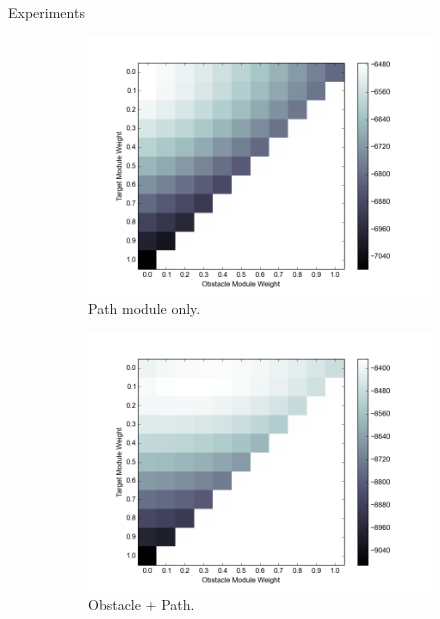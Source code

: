\documentclass[final]{beamer}
\begin{document}
\begin{frame}{}
\begin{textblock}{39}
\begin{block}{Experiments}
\begin{figure}[h]
\centering
\begin{subfigure}[b]{0.24\textwidth}
\includegraphics[width=\textwidth]{objValuesTask1.png}
\caption{Path module only.}
\end{subfigure}
\begin{subfigure}[b]{0.24\textwidth}
\includegraphics[width=\textwidth]{objValuesTask2.png}
\caption{Obstacle + Path. }
\end{subfigure}
\begin{subfigure}[b]{0.24\textwidth}

\end{subfigure}
\end{figure}
\end{block}
\end{textblock}
\end{frame}
\end{document}
